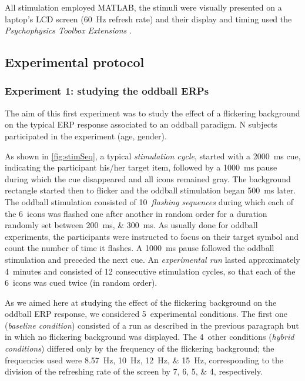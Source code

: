\documentclass[10pt]{article}
\begin{document}
    All stimulation employed MATLAB\textsuperscript{\textregistered}, the stimuli were visually presented on a laptop's LCD screen (\SI{60}{\Hz} refresh rate) and their display and timing used the \emph{Psychophysics Toolbox Extensions} \parencite{Brainard1997,Pelli1997}.


    \subsection{Experimental protocol}
    \label{sec:2.2Protocol}

        \subsubsection{Experiment 1: studying the oddball \acsp{ERP}}
        \label{sec:2.2.1ProtocolOddball}

        The aim of this first experiment was to study the effect of a flickering background on the typical \ac{ERP} response associated to an oddball paradigm.
        N subjects participated in the experiment (age, gender).

        As shown in \autoref{fig:stimSeq}, a typical \emph{stimulation cycle}, started with a \SI{2000}{\ms} cue, indicating the participant his/her target item, followed by a \SI{1000}{\ms} pause during which the cue disappeared and all icons remained gray.
        The background rectangle started then to flicker and the oddball stimulation began \SI{500}{\ms} later.
        The oddball stimulation consisted of 10~\emph{flashing sequences} during which each of the 6~icons was flashed one after another in random order for a duration randomly set between \SIlist[list-units = single]{200;300}{\ms}.
        As usually done for oddball experiments, the participants were instructed to focus on their target symbol and count the number of time it flashes.
        A \SI{1000}{\ms} pause followed the oddball stimulation and preceded the next cue.
        An \emph{experimental run} lasted approximately 4~minutes and consisted of 12 consecutive stimulation cycles, so that each of the 6~icons was cued twice (in random order).

        As we aimed here at studying the effect of the flickering background on the oddball \ac{ERP} response, we considered 5~experimental conditions.
        The first one (\emph{baseline condition}) consisted of a run as described in the previous paragraph but in which no flickering background was displayed.
        The 4~other conditions (\emph{hybrid conditions}) differed only by the frequency of the flickering background; the frequencies used were \SIlist[list-units = single]{8.57;10;12;15}{\Hz}, corresponding to the division of the refreshing rate of the screen by \numlist{7;6;5;4}, respectively.
\end{document}
